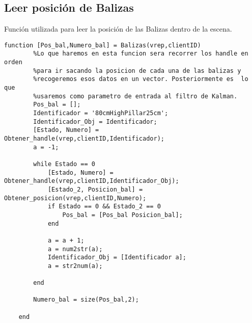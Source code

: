 \subsection{Leer posición de Balizas}
Función utilizada para leer la posición de las Balizas dentro de la escena.
\begin{lstlisting}[frame=single]
function [Pos_bal,Numero_bal] = Balizas(vrep,clientID)
        %Lo que haremos en esta funcion sera recorrer los handle en orden
        %para ir sacando la posicion de cada una de las balizas y
        %recogeremos esos datos en un vector. Posteriormente es  lo que
        %usaremos como parametro de entrada al filtro de Kalman.
        Pos_bal = [];
        Identificador = '80cmHighPillar25cm';
        Identificador_Obj = Identificador;
        [Estado, Numero] = Obtener_handle(vrep,clientID,Identificador);
        a = -1;
  
        while Estado == 0
            [Estado, Numero] = Obtener_handle(vrep,clientID,Identificador_Obj);
            [Estado_2, Posicion_bal] = Obtener_posicion(vrep,clientID,Numero);
            if Estado == 0 && Estado_2 == 0
                Pos_bal = [Pos_bal Posicion_bal];
            end

            a = a + 1;
            a = num2str(a);
            Identificador_Obj = [Identificador a]; 
            a = str2num(a);

        end

        Numero_bal = size(Pos_bal,2);
        
    end
\end{lstlisting}
